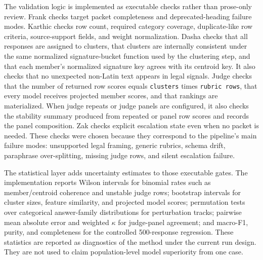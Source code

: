 The validation logic is implemented as executable checks rather than prose-only
review. Frank checks target packet completeness and deprecated-heading failure
modes. Karthic checks row count, required category coverage, duplicate-like row
criteria, source-support fields, and weight normalization. Dasha checks that all
responses are assigned to clusters, that clusters are internally consistent under
the same normalized signature-bucket function used by the clustering step, and
that each member's normalized signature key agrees with its centroid key. It
also checks that no unexpected non-Latin text appears in legal signals. Judge checks that the
number of returned row scores equals \texttt{clusters} times \texttt{rubric
rows}, that every model receives projected member scores, and that rankings are
materialized. When judge repeats or judge panels are configured, it also checks
the stability summary produced from repeated or panel row scores and records the
panel composition. Zak checks explicit escalation state even when no packet is
needed.
These checks were chosen because they correspond to the pipeline's main failure
modes: unsupported legal framing, generic rubrics, schema drift, paraphrase
over-splitting, missing judge rows, and silent escalation failure.

The statistical layer adds uncertainty estimates to those executable gates. The
implementation reports Wilson intervals for binomial rates such as
member/centroid coherence and unstable judge rows; bootstrap intervals for
cluster sizes, feature similarity, and projected model scores; permutation tests
over categorical answer-family distributions for perturbation tracks; pairwise
mean absolute error and weighted \(\kappa\) for judge-panel agreement; and
macro-F1, purity, and completeness for the controlled 500-response regression.
These statistics are reported as diagnostics of the method under the current
run design. They are not used to claim population-level model superiority from
one case.

